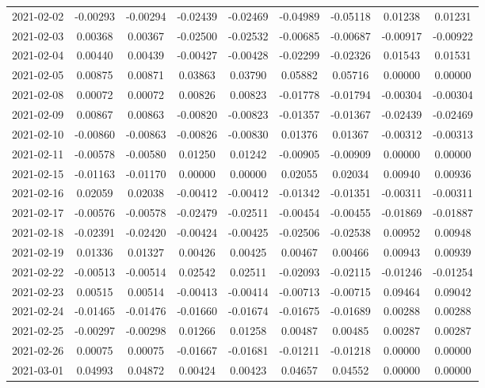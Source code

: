 {\begin{footnotesize}
\begin{longtable}{lcccccccc}
2021-02-02 & -0.00293 & -0.00294 & -0.02439 & -0.02469 & -0.04989 & -0.05118 & 0.01238 & 0.01231 \\
2021-02-03 & 0.00368 & 0.00367 & -0.02500 & -0.02532 & -0.00685 & -0.00687 & -0.00917 & -0.00922 \\
2021-02-04 & 0.00440 & 0.00439 & -0.00427 & -0.00428 & -0.02299 & -0.02326 & 0.01543 & 0.01531 \\
2021-02-05 & 0.00875 & 0.00871 & 0.03863 & 0.03790 & 0.05882 & 0.05716 & 0.00000 & 0.00000 \\
2021-02-08 & 0.00072 & 0.00072 & 0.00826 & 0.00823 & -0.01778 & -0.01794 & -0.00304 & -0.00304 \\
2021-02-09 & 0.00867 & 0.00863 & -0.00820 & -0.00823 & -0.01357 & -0.01367 & -0.02439 & -0.02469 \\
2021-02-10 & -0.00860 & -0.00863 & -0.00826 & -0.00830 & 0.01376 & 0.01367 & -0.00312 & -0.00313 \\
2021-02-11 & -0.00578 & -0.00580 & 0.01250 & 0.01242 & -0.00905 & -0.00909 & 0.00000 & 0.00000 \\
2021-02-15 & -0.01163 & -0.01170 & 0.00000 & 0.00000 & 0.02055 & 0.02034 & 0.00940 & 0.00936 \\
2021-02-16 & 0.02059 & 0.02038 & -0.00412 & -0.00412 & -0.01342 & -0.01351 & -0.00311 & -0.00311 \\
2021-02-17 & -0.00576 & -0.00578 & -0.02479 & -0.02511 & -0.00454 & -0.00455 & -0.01869 & -0.01887 \\
2021-02-18 & -0.02391 & -0.02420 & -0.00424 & -0.00425 & -0.02506 & -0.02538 & 0.00952 & 0.00948 \\
2021-02-19 & 0.01336 & 0.01327 & 0.00426 & 0.00425 & 0.00467 & 0.00466 & 0.00943 & 0.00939 \\
2021-02-22 & -0.00513 & -0.00514 & 0.02542 & 0.02511 & -0.02093 & -0.02115 & -0.01246 & -0.01254 \\
2021-02-23 & 0.00515 & 0.00514 & -0.00413 & -0.00414 & -0.00713 & -0.00715 & 0.09464 & 0.09042 \\
2021-02-24 & -0.01465 & -0.01476 & -0.01660 & -0.01674 & -0.01675 & -0.01689 & 0.00288 & 0.00288 \\
2021-02-25 & -0.00297 & -0.00298 & 0.01266 & 0.01258 & 0.00487 & 0.00485 & 0.00287 & 0.00287 \\
2021-02-26 & 0.00075 & 0.00075 & -0.01667 & -0.01681 & -0.01211 & -0.01218 & 0.00000 & 0.00000 \\
2021-03-01 & 0.04993 & 0.04872 & 0.00424 & 0.00423 & 0.04657 & 0.04552 & 0.00000 & 0.00000 \\

\end{longtable}
\end{footnotesize}}
